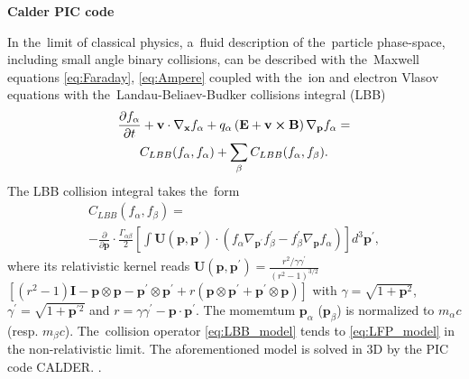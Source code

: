 \textbf{Calder PIC code}

In the~limit of classical physics, a~fluid description of the~particle 
phase-space, including small angle binary collisions, can be described with 
the~Maxwell equations \eqref{eq:Faraday}, \eqref{eq:Ampere}
coupled with the~ion and electron Vlasov equations with 
the~Landau-Beliaev-Budker collisions integral (LBB)
\cite{Landau_1936, Beliaev_SPD1956} 
\begin{multline}
\frac{\partial f_\alpha}{\partial t}+\mathbf{v}\cdot\nabla_{\mathbf{x}}f_\alpha+q_\alpha\left(\mathbf{E}+\mathbf{v}\boldsymbol{\times}\mathbf{B}\right)\nabla_{\mathbf{p}}f_\alpha =
\\
C_{LBB}(f_\alpha,f_\alpha)+\sum_\beta C_{LBB}(f_\alpha,f_\beta)
.
\end{multline}
The LBB collision integral takes the~form
\begin{multline}
C_{LBB}(f_\alpha,f_\beta)=
\\
-\frac{\partial}{\partial \mathbf{p}}\cdot\frac{\Gamma_{\alpha\beta}}{2}\left[\int \mathbf{U}(\mathbf{p},\mathbf{p}^\prime)\cdot(f_\alpha\nabla_{\mathbf{p}^\prime}f_\beta^\prime-f_\beta^\prime\nabla_{\mathbf{p}}f_\alpha)\right]d^3\mathbf{p}^\prime
,
\label{eq:LBB_model}
\end{multline}
where its relativistic kernel reads
$\mathbf{U}(\mathbf{p},\mathbf{p}^\prime)=\frac{r^2/\gamma\gamma^\prime}{(r^2-1)^{3/2}}$ 
$\left[(r^2-1)\mathbf{I}-\mathbf{p}\otimes\mathbf{p}-\mathbf{p}^\prime\otimes\mathbf{p}^\prime+r(\mathbf{p}\otimes\mathbf{p}^\prime+\mathbf{p}^\prime\otimes\mathbf{p})\right]$
with $\gamma=\sqrt{1+\mathbf{p}^2}$, $\gamma^\prime=\sqrt{1+\mathbf{p}^{\prime 2}}$ and $r=\gamma\gamma^\prime-\mathbf{p}\cdot\mathbf{p}^\prime$. 
The momemtum $\mathbf{p}_\alpha$ ($\mathbf{p}_\beta$) is normalized to 
$m_\alpha c$ (resp. $m_\beta c$). The~collision operator \eqref{eq:LBB_model} 
tends to \eqref{eq:LFP_model} in the non-relativistic limit.
The aforementioned model is solved in 3D by the PIC code CALDER. 
\cite{Lefebvre_NF2003, Perez_PoP2012}.

